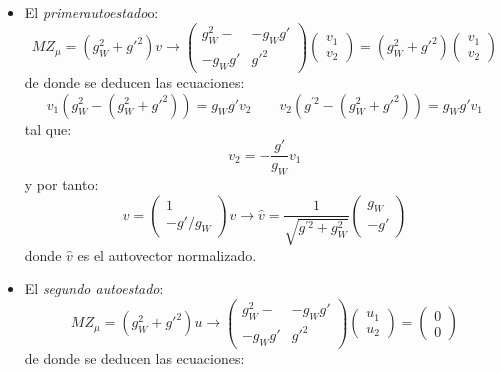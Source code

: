 \begin{itemize}
	\item  El \textit{primerautoestado}o: 
	\begin{equation}
		M Z_\mu = (g_W^2 + g'^2) v \to \begin{pmatrix}
			g_W^2 - &  - g_W g' \\
			- g_W g' & g'^2
		\end{pmatrix}\begin{pmatrix}
			v_1 \\
			v_2 
		\end{pmatrix} = (g_W^2 + g'^2) \begin{pmatrix}
			v_1 \\
			v_2 
		\end{pmatrix}
	\end{equation}
	de donde se deducen las ecuaciones: 
	\begin{equation}
		v_1 (g_W^2 - (g_W^2 + g'^2)) = g_W g' v_2 \qquad 
		v_2 (g^{\prime 2} - (g_W^2 + g'^2)) = g_W g' v_1  
	\end{equation}
	tal que: 
	\begin{equation}
		v_2 = - \frac{g'}{g_W} v_1 
	\end{equation}
	y por tanto: 
	\begin{equation}
		v = \begin{pmatrix}
			1 \\ 
			-g'/g_W
		\end{pmatrix}v \to \hat{v} = \frac{1}{\sqrt{g^{\prime 2}+g_W^2}} \begin{pmatrix}
			g_W \\ 
			-g' 
		\end{pmatrix}
	\end{equation}
	donde $\hat{v}$ es el autovector normalizado. 
	\item  El \textit{segundo autoestado}: 
	\begin{equation}
		M Z_\mu = (g_W^2 + g'^2) u \to \begin{pmatrix}
			g_W^2 - &  - g_W g' \\
			- g_W g' & g'^2
		\end{pmatrix}\begin{pmatrix}
			u_1 \\
			u_2 
		\end{pmatrix} = \begin{pmatrix}
			0 \\
			0 
		\end{pmatrix}
	\end{equation}
	de donde se deducen las ecuaciones: 

\end{itemize}

